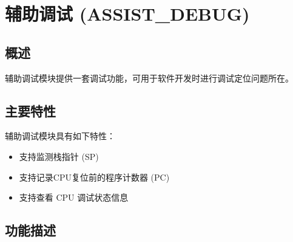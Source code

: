 \documentclass[main\_\_CN.tex]{subfiles}
\begin{document}

\ifglobal
\else
    {\let\clearpage\relax \listoftodos}
    {\let\clearpage\relax \listofdonetodos}
    \tableofcontents
\fi






\hypertarget{dbgassist}{}
\chapter{辅助调试 (ASSIST\_DEBUG)}
\label{mod:dbgassist}


\section{概述}

辅助调试模块提供一套调试功能，可用于软件开发时进行调试定位问题所在。



\section{主要特性}
\label{sec:dbgassist-features}

辅助调试模块具有如下特性：

\begin{itemize}
    \item 支持监测栈指针 (SP)
    \item 支持记录CPU复位前的程序计数器 (PC)
    \item 支持查看 CPU 调试状态信息
\end{itemize}



\section{功能描述}
\label{sec:dbgassist-func-descr}
\end{document}
